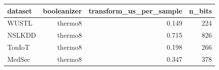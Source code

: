 \begin{tabular}{lrrr}
\toprule
dataset & booleanizer & transform\_us\_per\_sample & n\_bits \\
\midrule
WUSTL & thermo8 & 0.149 & 224 \\
NSLKDD & thermo8 & 0.715 & 826 \\
TonIoT & thermo8 & 0.198 & 266 \\
MedSec & thermo8 & 0.347 & 378 \\
\bottomrule
\end{tabular}
